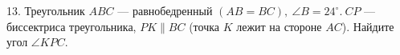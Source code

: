 13. Треугольник $ABC$ --- равнобедренный $(AB=BC),\ \angle B=24^\circ.\ CP$ ---
биссектриса треугольника, $PK\parallel BC$ (точка $K$ лежит на стороне $AC$). Найдите угол $\angle KPC.$\\

